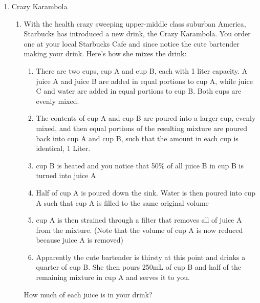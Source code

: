 \documentclass{article}
\begin{document}
\begin{enumerate}
    \item Crazy Karambola
    \begin{enumerate}
        \item  With the health crazy sweeping upper-middle class suburban America, Starbucks has introduced a new drink, the Crazy Karambola. You order one at your local Starbucks Cafe and since notice the cute bartender making your drink. Here's how she mixes the drink:
        \begin{enumerate}
            \item There are two cups, cup A and cup B, each with 1 liter capacity. A juice A and juice B are added in equal portions to cup A, while juice C and water are added in equal portions to cup B. Both cups are evenly mixed.
            \item The contents of cup A and cup B are poured into a larger cup, evenly mixed, and then equal portions of the resulting mixture are poured back into cup A and cup B, such that the amount in each cup is identical, 1 Liter.
            \item cup B is heated and you notice that 50\% of all juice B in cup B is turned into juice A
            \item Half of cup A is poured down the sink. Water is then poured into cup A such that cup A is filled to the same original volume
            \item cup A is then strained through a filter that removes all of juice A from the mixture. (Note that the volume of cup A is now reduced because juice A is removed)
            \item Apparently the cute bartender is thirsty at this point and drinks a quarter of cup B. She then pours 250mL of cup B and half of the remaining mixture in cup A and serves it to you.
        \end{enumerate}
        How much of each juice is in your drink?

        
    \end{enumerate}
    

\end{enumerate}
\end{document}
